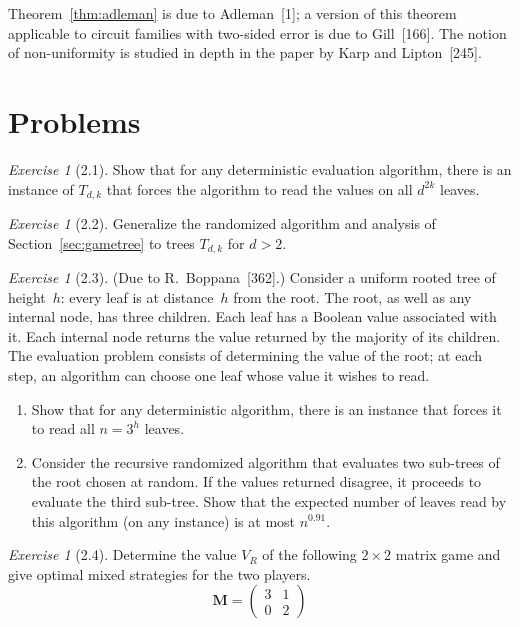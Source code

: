 \documentclass[twoside,12pt]{book}
\theoremstyle{plain}
\theoremstyle{definition}
\theoremstyle{remark}
\newtheorem{exercise}[theorem]{Exercise}
\begin{document}
Theorem~\ref{thm:adleman} is due to Adleman~[1]; a version of this theorem
applicable to circuit families with two-sided error is due to Gill~[166].  The
notion of non-uniformity is studied in depth in the paper by Karp and
Lipton~[245].

\section*{Problems}

\begin{exercise}[2.1]
Show that for any deterministic evaluation algorithm, there is an instance of
$T_{d,k}$ that forces the algorithm to read the values on all $d^{2k}$ leaves.
\end{exercise}

\begin{exercise}[2.2]
Generalize the randomized algorithm and analysis of Section~\ref{sec:gametree}
to trees $T_{d,k}$ for $d>2$.
\end{exercise}

\begin{exercise}[2.3]
(Due to R.~Boppana~[362].)  Consider a uniform rooted tree of height~$h$:
every leaf is at distance~$h$ from the root.  The root, as well as any
internal node, has three children.  Each leaf has a Boolean value associated
with it.  Each internal node returns the value returned by the majority of its
children.  The evaluation problem consists of determining the value of the
root; at each step, an algorithm can choose one leaf whose value it wishes to
read.
\begin{enumerate}[label=(\alph*)]
\item Show that for any deterministic algorithm, there is an instance that
  forces it to read all $n=3^h$ leaves.
\item Consider the recursive randomized algorithm that evaluates two sub-trees
  of the root chosen at random.  If the values returned disagree, it proceeds
  to evaluate the third sub-tree.  Show that the expected number of leaves
  read by this algorithm (on any instance) is at most $n^{0.91}$.
\end{enumerate}
\end{exercise}

\begin{exercise}[2.4]
Determine the value $V_R$ of the following $2\times 2$ matrix game and give
optimal mixed strategies for the two players.
\[
  \mathbf{M} = \begin{pmatrix} 3 & 1 \\ 0 & 2 \end{pmatrix}
\]
\end{exercise}
\end{document}
